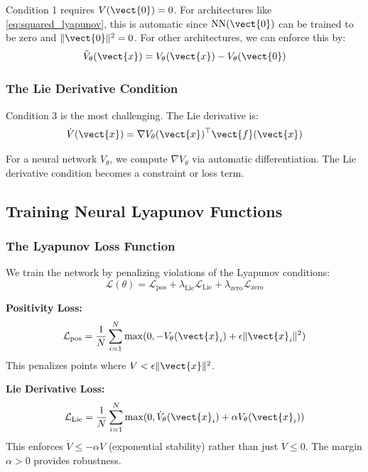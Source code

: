 Condition 1 requires $V(\vect{0}) = 0$. For architectures like \eqref{eq:squared_lyapunov}, this is automatic since $\text{NN}(\vect{0})$ can be trained to be zero and $\|\vect{0}\|^2 = 0$. For other architectures, we can enforce this by:
\begin{equation}
\tilde{V}_\theta(\vect{x}) = V_\theta(\vect{x}) - V_\theta(\vect{0})
\end{equation}

\subsubsection{The Lie Derivative Condition}

Condition 3 is the most challenging. The Lie derivative is:
\begin{equation}
\dot{V}(\vect{x}) = \nabla V_\theta(\vect{x})^\top \vect{f}(\vect{x})
\label{eq:lie_derivative}
\end{equation}

For a neural network $V_\theta$, we compute $\nabla V_\theta$ via automatic differentiation. The Lie derivative condition becomes a constraint or loss term.

\subsection{Training Neural Lyapunov Functions}

\subsubsection{The Lyapunov Loss Function}

We train the network by penalizing violations of the Lyapunov conditions:
\begin{equation}
\mathcal{L}(\theta) = \mathcal{L}_{\text{pos}} + \lambda_{\text{Lie}} \mathcal{L}_{\text{Lie}} + \lambda_{\text{zero}} \mathcal{L}_{\text{zero}}
\label{eq:lyapunov_loss}
\end{equation}

\textbf{Positivity Loss:}
\begin{equation}
\mathcal{L}_{\text{pos}} = \frac{1}{N} \sum_{i=1}^{N} \max(0, -V_\theta(\vect{x}_i) + \epsilon \|\vect{x}_i\|^2)
\end{equation}
This penalizes points where $V < \epsilon\|\vect{x}\|^2$.

\textbf{Lie Derivative Loss:}
\begin{equation}
\mathcal{L}_{\text{Lie}} = \frac{1}{N} \sum_{i=1}^{N} \max(0, \dot{V}_\theta(\vect{x}_i) + \alpha V_\theta(\vect{x}_i))
\label{eq:lie_loss}
\end{equation}
This enforces $\dot{V} \leq -\alpha V$ (exponential stability) rather than just $\dot{V} \leq 0$. The margin $\alpha > 0$ provides robustness.

